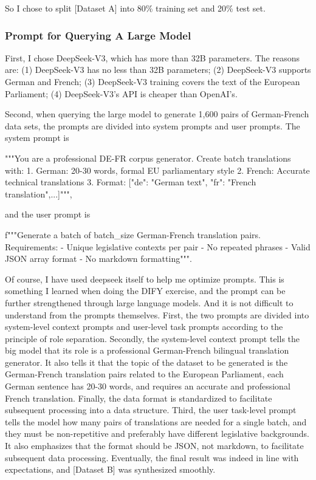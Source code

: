 So I chose to split [Dataset A] into 80\% training set and 20\% test set.

\subsubsection{Prompt for Querying A Large Model}
First, I chose DeepSeek-V3\cite{DeepSeek-V3}, which has more than 32B parameters. 
The reasons are: 
(1) DeepSeek-V3 has no less than 32B parameters; 
(2) DeepSeek-V3 supports German and French; 
(3) DeepSeek-V3 training covers the text of the European Parliament; 
(4) DeepSeek-V3's API is cheaper than OpenAI's.

Second, when querying the large model to generate 1,600 pairs of German-French data sets, 
the prompts are divided into system prompts and user prompts. 
The system prompt is 

"""You are a professional DE-FR corpus generator. Create batch translations with:
    1. German: 20-30 words, formal EU parliamentary style
    2. French: Accurate technical translations
    3. Format:
    [{"de": "German text", "fr": "French translation"},...]""",

and the user prompt is

f"""Generate a batch of {batch\_size} German-French translation pairs.
Requirements:
- Unique legislative contexts per pair
- No repeated phrases
- Valid JSON array format
- No markdown formatting""".

Of course, I have used deepseek itself to help me optimize prompts. 
This is something I learned when doing the DIFY exercise, and the prompt can be further strengthened through large language models.
And it is not difficult to understand from the prompts themselves.
First, the two prompts are divided into system-level context prompts and user-level task prompts according to the principle of role separation.
Secondly, the system-level context prompt tells the big model that its role is a professional German-French bilingual translation generator. 
It also tells it that the topic of the dataset to be generated is the German-French translation pairs related to the European Parliament, 
each German sentence has 20-30 words, and requires an accurate and professional French translation. 
Finally, the data format is standardized to facilitate subsequent processing into a data structure.
Third, the user task-level prompt tells the model how many pairs of translations are needed for a single batch, 
and they must be non-repetitive and preferably have different legislative backgrounds. 
It also emphasizes that the format should be JSON, not markdown, to facilitate subsequent data processing.
Eventually, the final result was indeed in line with expectations, and [Dataset B] was synthesized smoothly.

